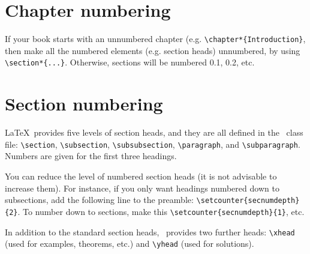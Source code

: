 
\section{Chapter numbering}
If your book starts with an unnumbered chapter (e.g. \verb"\chapter*{Introduction}", then make all the numbered elements (e.g. section heads) unnumbered, by using \verb"\section*{...}". Otherwise, sections will be numbered 0.1, 0.2, etc.

\section{Section numbering}

\LaTeX\ provides five levels of section heads, and they are all defined in the \cambridge\ class file: \verb"\section", \verb"\subsection", \verb"\subsubsection", \verb"\paragraph", and \verb"\subparagraph". Numbers are given for the first three headings.

You can reduce the level of numbered section heads (it is not advisable to increase them). For instance, if you only want headings numbered down to subsections, add the following line to the preamble: \verb"\setcounter{secnumdepth}{2}". To number down to sections, make this \verb"\setcounter{secnumdepth}{1}", etc.

In addition to the standard section heads, \cambridge\ provides two further heads: \verb"\xhead" (used for examples, theorems, etc.) and \verb"\yhead" (used for solutions).



